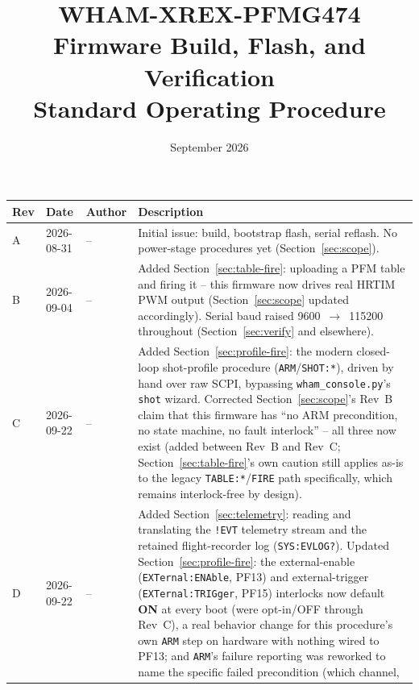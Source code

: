 \documentclass[11pt]{article}
\title{WHAM-XREX-PFMG474\\ \large Firmware Build, Flash, and Verification \\ Standard Operating Procedure}
\author{}
\date{September 2026}
\newcommand{\code}[1]{\texttt{#1}}
\begin{document}
\maketitle

\begin{longtable}{p{0.45in} p{0.75in} p{0.5in} p{2.7in}}
  \hline
  \textbf{Rev} & \textbf{Date} & \textbf{Author} & \textbf{Description} \\
  \hline
  \endhead
  A & 2026-08-31 & -- & Initial issue: build, bootstrap flash, serial
    reflash. No power-stage procedures yet (Section~\ref{sec:scope}). \\
  B & 2026-09-04 & -- & Added Section~\ref{sec:table-fire}: uploading a
    PFM table and firing it -- this firmware now drives real HRTIM PWM
    output (Section~\ref{sec:scope} updated accordingly). Serial baud
    raised 9600~$\to$~115200 throughout (Section~\ref{sec:verify} and
    elsewhere). \\
  C & 2026-09-22 & -- & Added Section~\ref{sec:profile-fire}: the modern
    closed-loop shot-profile procedure (\code{ARM}/\code{SHOT:*}),
    driven by hand over raw SCPI, bypassing \code{wham\_console.py}'s
    \code{shot} wizard. Corrected Section~\ref{sec:scope}'s Rev~B claim
    that this firmware has ``no ARM precondition, no state machine, no
    fault interlock'' -- all three now exist (added between Rev~B and
    Rev~C; Section~\ref{sec:table-fire}'s own caution still applies
    as-is to the legacy \code{TABLE:*}/\code{FIRE} path specifically,
    which remains interlock-free by design). \\
  D & 2026-09-22 & -- & Added Section~\ref{sec:telemetry}: reading and
    translating the \code{!EVT} telemetry stream and the retained
    flight-recorder log (\code{SYS:EVLOG?}). Updated
    Section~\ref{sec:profile-fire}: the external-enable
    (\code{EXTernal:ENAble}, PF13) and external-trigger
    (\code{EXTernal:TRIGger}, PF15) interlocks now default \textbf{ON}
    at every boot (were opt-in/OFF through Rev~C), a real behavior
    change for this procedure's own \code{ARM} step on hardware with
    nothing wired to PF13; and \code{ARM}'s failure reporting was
    reworked to name the specific failed precondition (which channel,

\end{longtable}
\end{document}
